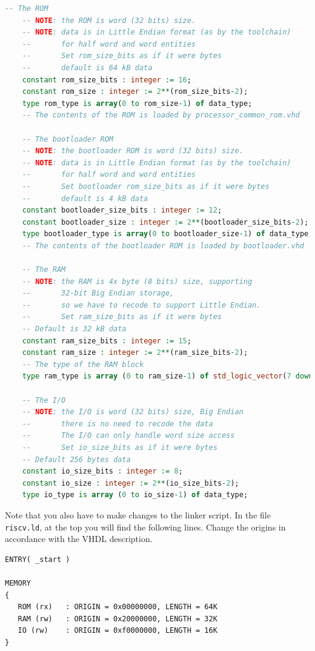 \documentclass[12pt]{article}
\begin{document}
\begin{lstlisting}[language=VHDL]
    -- The ROM
    -- NOTE: the ROM is word (32 bits) size.
    -- NOTE: data is in Little Endian format (as by the toolchain)
    --       for half word and word entities
    --       Set rom_size_bits as if it were bytes
    --       default is 64 kB data
    constant rom_size_bits : integer := 16;
    constant rom_size : integer := 2**(rom_size_bits-2);
    type rom_type is array(0 to rom_size-1) of data_type;
    -- The contents of the ROM is loaded by processor_common_rom.vhd
    
    -- The bootloader ROM
    -- NOTE: the bootloader ROM is word (32 bits) size.
    -- NOTE: data is in Little Endian format (as by the toolchain)
    --       for half word and word entities
    --       Set bootloader rom_size_bits as if it were bytes
    --       default is 4 kB data
    constant bootloader_size_bits : integer := 12;
    constant bootloader_size : integer := 2**(bootloader_size_bits-2);
    type bootloader_type is array(0 to bootloader_size-1) of data_type;
    -- The contents of the bootloader ROM is loaded by bootloader.vhd
    
    -- The RAM
    -- NOTE: the RAM is 4x byte (8 bits) size, supporting
    --       32-bit Big Endian storage,
    --       so we have to recode to support Little Endian.
    --       Set ram_size_bits as if it were bytes
    -- Default is 32 kB data
    constant ram_size_bits : integer := 15;
    constant ram_size : integer := 2**(ram_size_bits-2);
    -- The type of the RAM block
    type ram_type is array (0 to ram_size-1) of std_logic_vector(7 downto 0);
                        
    -- The I/O
    -- NOTE: the I/O is word (32 bits) size, Big Endian
    --       there is no need to recode the data
    --       The I/O can only handle word size access
    --       Set io_size_bits as if it were bytes
    -- Default 256 bytes data
    constant io_size_bits : integer := 8;
    constant io_size : integer := 2**(io_size_bits-2);
    type io_type is array (0 to io_size-1) of data_type;
\end{lstlisting}

Note that you also have to make changes to the linker script. In the file \lstinline|riscv.ld|, at the top you will find the following lines. Change the origins in accordance with the VHDL description.

\begin{lstlisting}
ENTRY( _start )

MEMORY
{
   ROM (rx)   : ORIGIN = 0x00000000, LENGTH = 64K
   RAM (rw)   : ORIGIN = 0x20000000, LENGTH = 32K
   IO (rw)    : ORIGIN = 0xf0000000, LENGTH = 16K
}
\end{lstlisting}
\end{document}

